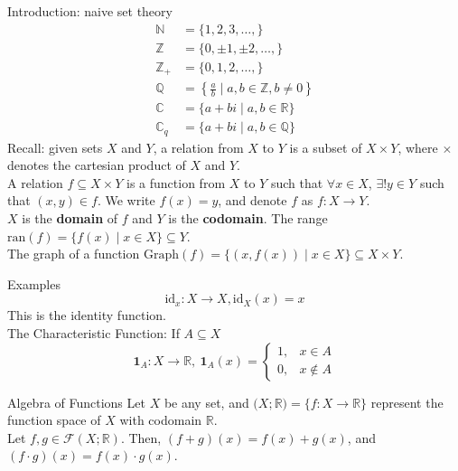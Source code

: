 \documentclass[10pt]{extarticle}
\title{}
\author{Avinash Iyer}
\date{}
\begin{document}
  \begin{problem}{Introduction: naive set theory}
    \begin{align*}
      \mathbb{N} &= \{1,2,3,\dots,\}\\
      \mathbb{Z} &= \{0,\pm1,\pm2,\dots,\} \\
      \mathbb{Z}_+ &= \{0,1,2,\dots,\}\\
      \mathbb{Q} &= \left\{\frac{a}{b} \mid a,b\in\mathbb{Z},b\neq 0\right\}\\
      \mathbb{C} &= \{a+bi \mid a,b\in \mathbb{R}\}\\
      \mathbb{C}_q &= \{a+bi \mid a,b\in \mathbb{Q}\}
    \end{align*}
    Recall: given sets $X$ and $Y$, a relation from $X$ to $Y$ is a subset of $X\times Y$, where $\times$ denotes the cartesian product of $X$ and $Y$.\\

    A relation $f\subseteq X\times Y$ is a function from $X$ to $Y$ such that $\forall x\in X$, $\exists!y\in Y$ such that $(x,y) \in f$. We write $f(x) = y$, and denote $f$ as $f:X\rightarrow Y$.\\

    $X$ is the \textbf{domain} of $f$ and $Y$ is the \textbf{codomain}. The range $\textrm{ran}(f) = \{f(x)\mid x\in X\}\subseteq Y$. \\

    The graph of a function $\textrm{Graph}(f) = \{(x,f(x))\mid x\in X\} \subseteq X\times Y$.
    \begin{problem}{Examples}
      \[\textrm{id}_x: X\rightarrow X, \textrm{id}_X(x) = x\]
      This is the identity function.\\

      The Characteristic Function: If $A\subseteq X$
      \[\mathbf{1}_A: X\rightarrow \mathbb{R}, ~\mathbf{1}_A(x) = \begin{cases}
        1,&x\in A\\
        0,&x\notin A
      \end{cases}\]
    \end{problem}
    \begin{problem}{Algebra of Functions}
      Let $X$ be any set, and $\mathcal(X;\mathbb{R}) = \{f:X\rightarrow \mathbb{R}\}$ represent the function space of $X$ with codomain $\mathbb{R}$.\\

      Let $f,g\in \mathcal{F}(X;\mathbb{R})$. Then, $(f+g)(x) = f(x) + g(x)$, and $(f\cdot g)(x) = f(x)\cdot g(x)$.\\


\end{problem}
\end{problem}
\end{document}
